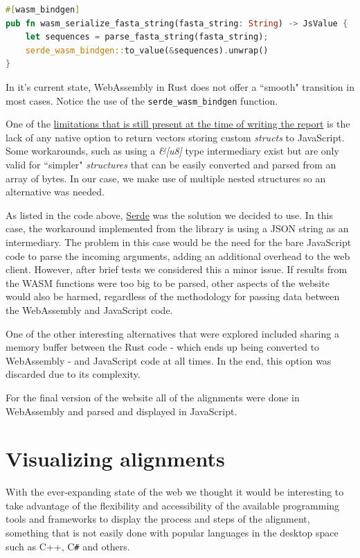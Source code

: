 \documentclass[twoside,openright,titlepage,numbers=noenddot,headinclude,%
                footinclude=true,cleardoublepage=empty,abstractoff, %
                BCOR=5mm,paper=a4,fontsize=11pt,%
                ngerman,american,%
                ]{scrreprt}
\begin{document}
\begin{lstlisting}[language=Rust,numbers=none]
#[wasm_bindgen]
pub fn wasm_serialize_fasta_string(fasta_string: String) -> JsValue {
    let sequences = parse_fasta_string(fasta_string);
    serde_wasm_bindgen::to_value(&sequences).unwrap()
}
\end{lstlisting}

In it's current state, WebAssembly in Rust does not offer a ``smooth" transition in most cases. Notice the use of the \lstinline[columns=fixed]{serde_wasm_bindgen} function.

One of the \href{https://github.com/rustwasm/wasm-bindgen/issues/111}{limitations that is still present at the time of writing the report} is the lack of any native option to return vectors storing custom \textit{structs} to JavaScript. Some workarounds, such as using a \textit{\&[u8]} type intermediary exist but are only valid for ``simpler" \textit{structures} that can be easily converted and parsed from an array of bytes. In our case, we make use of multiple nested structures so an alternative was needed.

As listed in the code above, \href{https://serde.rs/}{Serde} was the solution we decided to use. In this case, the workaround implemented from the library is using a JSON string as an intermediary. The problem in this case would be the need for the bare JavaScript code to parse the incoming arguments, adding an additional overhead to the web client. However, after brief tests we considered this a minor issue. If results from the WASM functions were too big to be parsed, other aspects of the website would also be harmed, regardless of the methodology for passing data between the WebAssembly and JavaScript code.

One of the other interesting alternatives that were explored included sharing a memory buffer between the Rust code - which ends up being converted to WebAssembly - and JavaScript code at all times. In the end, this option was discarded due to its complexity.

For the final version of the website all of the alignments were done in WebAssembly and parsed and displayed in JavaScript.

\section{Visualizing alignments}
With the ever-expanding state of the web we thought it would be interesting to take advantage of the flexibility and accessibility of the available programming tools and frameworks to display the process and steps of the alignment, something that is not easily done with popular languages in the desktop space such as C++, C\verb|#| and others.
\end{document}
